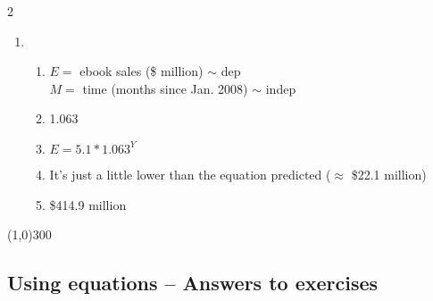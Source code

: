 \begin{multicols} {2}
\begin{enumerate}
\item %
\begin{enumerate}
\item $E=$ ebook sales (\$ million) $\sim$ dep \\ $M=$ time (months since Jan. 2008) $\sim$ indep 
\item 1.063
\item $E = 5.1 \ast 1.063^Y$
\item It's just a little lower than the equation predicted ($\approx$ \$22.1 million)
\item \$414.9 million
\end{enumerate}

\end{enumerate}
\end{multicols}

\begin{center}
\line(1,0){300} %
\end{center}

\subsection {Using equations -- Answers to exercises} %

